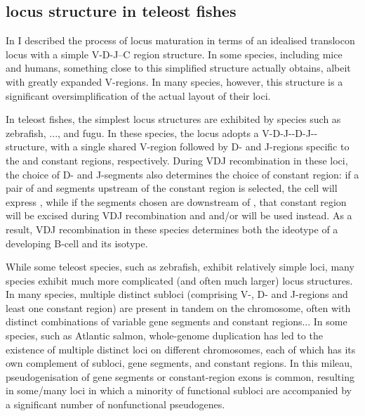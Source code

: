 
\subsection{\igh{} locus structure in teleost fishes}

In  I described the process of \igh{} locus maturation in terms of an idealised translocon locus with a simple V-D-J--C region structure. In some species, including mice and humans, something close to this simplified structure actually obtains, albeit with greatly expanded V-regions. %
In many species, however, this structure is a significant oversimplification of the actual layout of their \igh{} loci.

In teleost fishes, the simplest locus structures are exhibited by species such as zebrafish, ..., and fugu. In these species, the \igh{} locus adopts a V-D-J-\cz{}-D-J-\cm{}-\cd{} structure, with a single shared V-region followed by D- and J-regions specific to the  and  constant regions, respectively. During VDJ recombination in these loci, the choice of D- and J-segments also determines the choice of constant region: if a pair of \dh and \jh segments upstream of the  constant region is selected, the cell will express , while if the segments chosen are downstream of , that constant region will be excised during VDJ recombination and  and/or  will be used instead. As a result, VDJ recombination in these species determines both the ideotype of a developing B-cell and its isotype.

While some teleost species, such as zebrafish, exhibit relatively simple \igh{} loci, many species exhibit much more complicated (and often much larger) locus structures. In many species, multiple distinct subloci (comprising V-, D- and J-regions and least one constant region) are present in tandem on the chromosome, often with distinct combinations of variable gene segments and constant regions... %
In some species, such as Atlantic salmon, whole-genome duplication has led to the existence of multiple distinct \igh{} loci on different chromosomes, each of which has its own complement of subloci, gene segments, and constant regions. In this mileau, pseudogenisation of gene segments or constant-region exons is common, resulting in some/many loci in which a minority of functional subloci are accompanied by a significant number of nonfunctional pseudogenes. %

